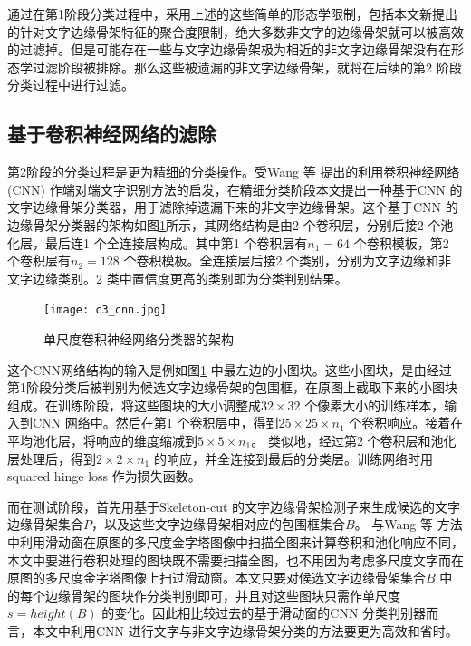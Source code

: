         通过在第1阶段分类过程中，采用上述的这些简单的形态学限制，包括本文新提出的针对文字边缘骨架特征的聚合度限制，绝大多数非文字的边缘骨架就可以被高效的过滤掉。但是可能存在一些与文字边缘骨架极为相近的非文字边缘骨架没有在形态学过滤阶段被排除。那么这些被遗漏的非文字边缘骨架，就将在后续的第2 阶段分类过程中进行过滤。

        \subsection{基于卷积神经网络的滤除}

        第2阶段的分类过程是更为精细的分类操作。受Wang 等\cite{Wang2012End} 提出的利用卷积神经网络(CNN) 作端对端文字识别方法的启发，在精细分类阶段本文提出一种基于CNN 的文字边缘骨架分类器，用于滤除掉遗漏下来的非文字边缘骨架。这个基于CNN 的边缘骨架分类器的架构如图\ref{fig.c3_cnn}所示，其网络结构是由2 个卷积层，分别后接2 个池化层，最后连1 个全连接层构成。其中第1 个卷积层有$n_1 = 64$ 个卷积模板，第2 个卷积层有$n_2 = 128$ 个卷积模板。全连接层后接2 个类别，分别为文字边缘和非文字边缘类别。2 类中置信度更高的类别即为分类判别结果。

        \begin{figure}[!h]
        \centering
        \texttt{[image: c3\_cnn.jpg]}
        \caption{单尺度卷积神经网络分类器的架构} \label{fig.c3_cnn}
        \end{figure}

        这个CNN网络结构的输入是例如图\ref{fig.c3_cnn} 中最左边的小图块。这些小图块，是由经过第1阶段分类后被判别为候选文字边缘骨架的包围框，在原图上截取下来的小图块组成。在训练阶段，将这些图块的大小调整成$32 \times 32$ 个像素大小的训练样本，输入到CNN 网络中。然后在第1 个卷积层中，得到$25 \times 25 \times n_1$ 个卷积响应。接着在平均池化层，将响应的维度缩减到$5 \times 5 \times n_1$。 类似地，经过第2 个卷积层和池化层处理后，得到$2 \times 2\times n_1$ 的响应，并全连接到最后的分类层。训练网络时用squared hinge loss 作为损失函数。

        而在测试阶段，首先用基于Skeleton-cut 的文字边缘骨架检测子来生成候选的文字边缘骨架集合$P$，以及这些文字边缘骨架相对应的包围框集合$B$。 与Wang 等\cite{Wang2012End} 方法中利用滑动窗在原图的多尺度金字塔图像中扫描全图来计算卷积和池化响应不同，本文中要进行卷积处理的图块既不需要扫描全图，也不用因为考虑多尺度文字而在原图的多尺度金字塔图像上扫过滑动窗。本文只要对候选文字边缘骨架集合$B$ 中的每个边缘骨架的图块作分类判别即可，并且对这些图块只需作单尺度$s = height(B)$ 的变化。因此相比较过去的基于滑动窗的CNN 分类判别器而言，本文中利用CNN 进行文字与非文字边缘骨架分类的方法要更为高效和省时。

